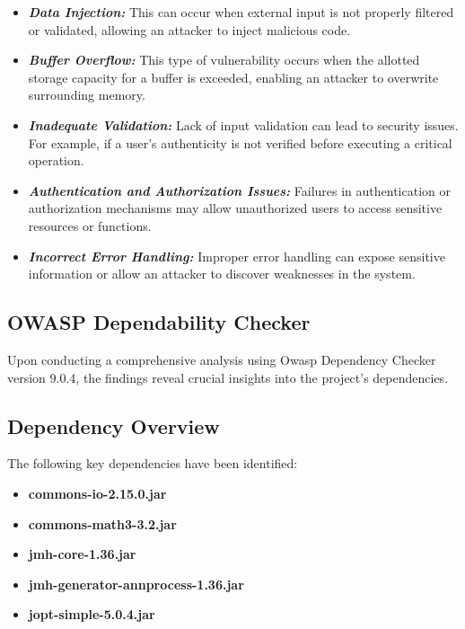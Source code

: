 \documentclass[sigconf]{acmart}
\begin{document}
\begin{itemize}
    \item \textbf{\textit{Data Injection:}} This can occur when external input is not properly filtered or validated, allowing an attacker to inject malicious code.
    
    \item \textbf{\textit{Buffer Overflow:}} This type of vulnerability occurs when the allotted storage capacity for a buffer is exceeded, enabling an attacker to overwrite surrounding memory.
    
    \item \textbf{\textit{Inadequate Validation:}} Lack of input validation can lead to security issues. For example, if a user's authenticity is not verified before executing a critical operation.
    
    \item \textbf{\textit{Authentication and Authorization Issues:}} Failures in authentication or authorization mechanisms may allow unauthorized users to access sensitive resources or functions.
    
    \item \textbf{\textit{Incorrect Error Handling:}} Improper error handling can expose sensitive information or allow an attacker to discover weaknesses in the system.
\end{itemize}

\subsection{OWASP Dependability Checker}
Upon conducting a comprehensive analysis using Owasp Dependency Checker\cite{owasp-dependency-check} version 9.0.4, the findings reveal crucial insights into the project's dependencies.

\subsection{Dependency Overview}

The following key dependencies have been identified:

\begin{itemize}
    \item \textbf{commons-io-2.15.0.jar}
    \item \textbf{commons-math3-3.2.jar}
    \item \textbf{jmh-core-1.36.jar}
    \item \textbf{jmh-generator-annprocess-1.36.jar}
    \item \textbf{jopt-simple-5.0.4.jar}
\end{itemize}
\end{document}
